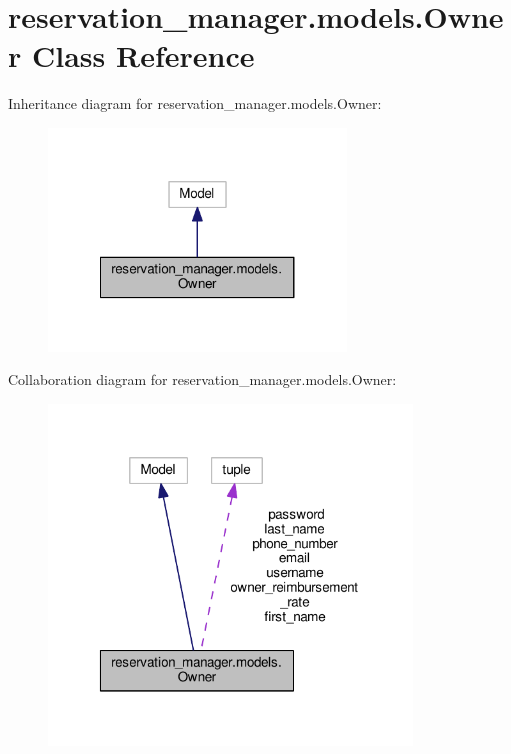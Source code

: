 \hypertarget{classreservation__manager_1_1models_1_1Owner}{\section{reservation\-\_\-manager.\-models.\-Owner Class Reference}
\label{classreservation__manager_1_1models_1_1Owner}
}


Inheritance diagram for reservation\-\_\-manager.\-models.\-Owner\-:
\nopagebreak
\begin{figure}[H]
\begin{center}
\leavevmode
\includegraphics[width=224pt]{classreservation__manager_1_1models_1_1Owner__inherit__graph}
\end{center}
\end{figure}


Collaboration diagram for reservation\-\_\-manager.\-models.\-Owner\-:
\nopagebreak
\begin{figure}[H]
\begin{center}
\leavevmode
\includegraphics[width=274pt]{classreservation__manager_1_1models_1_1Owner__coll__graph}
\end{center}
\end{figure}
